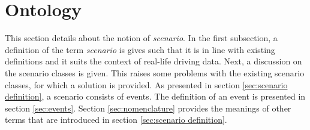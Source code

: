 \section{Ontology}
\label{sec:ontology}

This section details about the notion of \emph{scenario}. In the first subsection, a definition of the term \emph{scenario} is gives such that it is in line with existing definitions and it suits the context of real-life driving data. Next, a discussion on the scenario classes is given. This raises some problems with the existing scenario classes, for which a solution is provided. As presented in section \ref{sec:scenario definition}, a scenario consists of events. The definition of an event is presented in section \ref{sec:events}. Section \ref{sec:nomenclature} provides the meanings of other terms that are introduced in section \ref{sec:scenario definition}.





